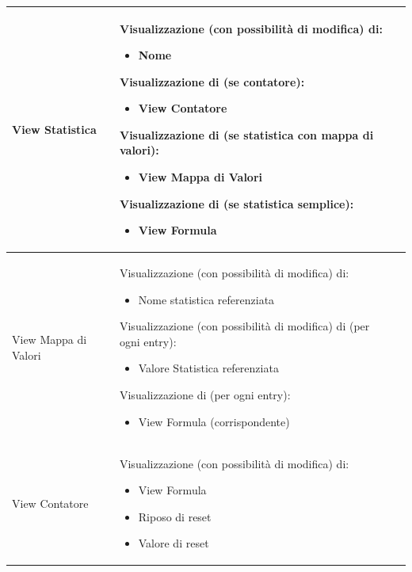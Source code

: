 \documentclass[a4paper, 11pt]{article}
\begin{document}
\begin{adjustwidth}{-1.5cm}{-1.5cm}
\begin{center}
\begin{longtable}{|p{5cm}|p{5cm}|p{5cm}|}
        View Statistica & 
        Visualizzazione (con possibilità di modifica) di:
        \begin{itemize}
            \item Nome
        \end{itemize}
        Visualizzazione di (se contatore):
        \begin{itemize}
            \item View Contatore
        \end{itemize}
        Visualizzazione di (se statistica con mappa di valori):
        \begin{itemize}
            \item View Mappa di Valori
        \end{itemize}
        Visualizzazione di (se statistica semplice):
        \begin{itemize}
            \item View Formula
        \end{itemize} & 
        \\ \hline
        
        View Mappa di Valori & 
        Visualizzazione (con possibilità di modifica) di:
        \begin{itemize}
            \item Nome statistica referenziata
        \end{itemize}
        Visualizzazione (con possibilità di modifica) di (per ogni entry):
        \begin{itemize}
            \item Valore Statistica referenziata
        \end{itemize}
        Visualizzazione di (per ogni entry):
        \begin{itemize}
            \item View Formula (corrispondente)
        \end{itemize} & 
        \\ \hline
        
        View Contatore & 
        Visualizzazione (con possibilità di modifica) di:
        \begin{itemize}
            \item View Formula
            \item Riposo di reset
            \item Valore di reset
        \end{itemize} & 
        \\ \hline
        

\end{longtable}
\end{center}
\end{adjustwidth}
\end{document}
